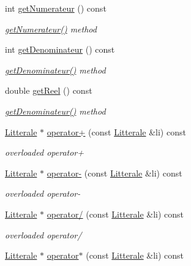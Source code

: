 \begin{DoxyCompactItemize}
int \hyperlink{class_li_reelle_aced0465644e6ce7c67dca27ef32d1f80}{get\+Numerateur} () const 
\begin{DoxyCompactList}\small\item\em \hyperlink{class_li_reelle_aced0465644e6ce7c67dca27ef32d1f80}{get\+Numerateur()} method \end{DoxyCompactList}\item 
int \hyperlink{class_li_reelle_a50d6d5764a8cff1ad1676db99c6f2115}{get\+Denominateur} () const 
\begin{DoxyCompactList}\small\item\em \hyperlink{class_li_reelle_a50d6d5764a8cff1ad1676db99c6f2115}{get\+Denominateur()} method \end{DoxyCompactList}\item 
double \hyperlink{class_li_reelle_a2a172ac11b3d20715ba981163da203f3}{get\+Reel} () const 
\begin{DoxyCompactList}\small\item\em \hyperlink{class_li_reelle_a50d6d5764a8cff1ad1676db99c6f2115}{get\+Denominateur()} method \end{DoxyCompactList}\item 
\hyperlink{class_litterale}{Litterale} $\ast$ \hyperlink{class_li_reelle_afb5b649702e7b1a87937d38d0034546f}{operator+} (const \hyperlink{class_litterale}{Litterale} \&li) const 
\begin{DoxyCompactList}\small\item\em overloaded operator+ \end{DoxyCompactList}\item 
\hyperlink{class_litterale}{Litterale} $\ast$ \hyperlink{class_li_reelle_a8347d9889eaaf4b156ca1f4684a14679}{operator-\/} (const \hyperlink{class_litterale}{Litterale} \&li) const 
\begin{DoxyCompactList}\small\item\em overloaded operator-\/ \end{DoxyCompactList}\item 
\hyperlink{class_litterale}{Litterale} $\ast$ \hyperlink{class_li_reelle_affc5e3fd0084475152cba8cc477dc1af}{operator/} (const \hyperlink{class_litterale}{Litterale} \&li) const 
\begin{DoxyCompactList}\small\item\em overloaded operator/ \end{DoxyCompactList}\item 
\hyperlink{class_litterale}{Litterale} $\ast$ \hyperlink{class_li_reelle_a3a9597d7bb98c85ff27a68498cc54533}{operator$\ast$} (const \hyperlink{class_litterale}{Litterale} \&li) const 

\end{DoxyCompactItemize}

